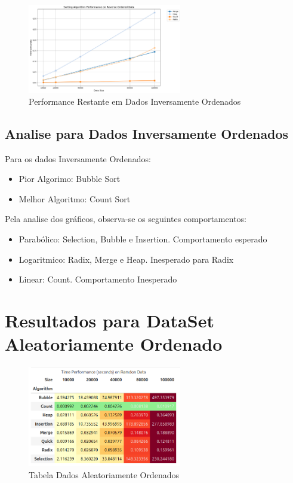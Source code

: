 \begin{figure}[H]
  \centering
  \includegraphics[width=0.6\textwidth]{images/o_inv}
  \caption{Performance Restante em Dados Inversamente Ordenados }
  \label{fig:Gráfico Performance Dados Inversamente Ordenados}
\end{figure}

\subsection{Analise para Dados Inversamente Ordenados}
Para os dados Inversamente Ordenados:
\begin{itemize}
  \item Pior Algorimo: Bubble Sort
  \item Melhor Algoritmo: Count Sort
\end{itemize}
Pela analise dos gráficos, observa-se os seguintes comportamentos:
\begin{itemize}
  \item Parabólico: Selection,  Bubble e Insertion. Comportamento esperado 
  \item Logaritmico: Radix, Merge e Heap. Inesperado para Radix 
  \item Linear: Count. Comportamento Inesperado
\end{itemize}

\section{Resultados para DataSet Aleatoriamente Ordenado}
\begin{figure}[H]
  \centering
  \includegraphics[width=0.6\textwidth]{images/random_table}
  \caption{Tabela Dados Aleatoriamente Ordenados}
  \label{fig:Tabela Dados Aleatoriamente Ordenados}
\end{figure}


